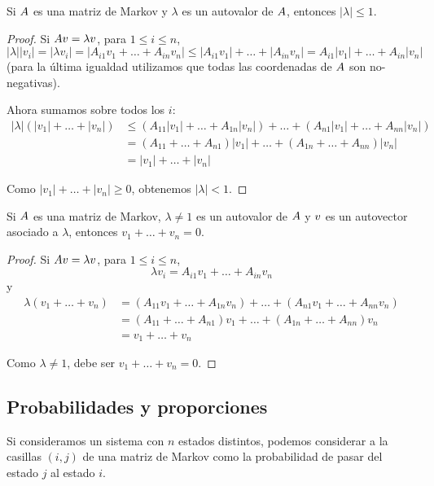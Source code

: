 \begin{prop}
Si $\Ab$ es una matriz de Markov y $\lambda$ es un autovalor de $\Ab$, entonces $|\lambda| \le 1$.
\end{prop}

\begin{proof}
Si $\Ab \vb = \lambda \vb$, para $1 \le i \le n$,
$$
|\lambda| |v_i| = |\lambda v_i| = |A_{i1} v_1 + \dots + A_{in} v_n| \le |A_{i1} v_1| + \dots + |A_{in} v_n| = A_{i1} |v_1| + \dots + A_{in} |v_n|
$$
(para la última igualdad utilizamos que todas las coordenadas de $\Ab$ son no-negativas).

Ahora sumamos sobre todos los $i$:
$$
\begin{aligned}
|\lambda|(|v_1| + \dots + |v_n|) &\le (A_{11} |v_1| + \dots + A_{1n} |v_n|) + \dots + (A_{n1} |v_1| + \dots + A_{nn} |v_n|) \\
&= (A_{11} + \dots + A_{n1}) |v_1| + \dots + (A_{1n} + \dots + A_{nn}) |v_n| \\
&= |v_1| + \dots + |v_n|
\end{aligned}
$$

Como $|v_1| + \dots + |v_n| \ge 0$, obtenemos $|\lambda| < 1$.
\end{proof}

\begin{prop}
Si $\Ab$ es una matriz de Markov, $\lambda \neq 1$ es un autovalor de $\Ab$ y $\vb$ es un autovector asociado a $\lambda$, entonces $v_1 + \dots + v_n = 0$.
\end{prop}

\begin{proof}
Si $\Ab \vb = \lambda \vb$, para $1 \le i \le n$,
$$
\lambda v_i = A_{i1} v_1 + \dots + A_{in} v_n
$$
y
$$
\begin{aligned}
\lambda(v_1 + \dots + v_n) &= (A_{11} v_1 + \dots + A_{1n} v_n) + \dots + (A_{n1} v_1 + \dots + A_{nn} v_n) \\
&= (A_{11} + \dots + A_{n1}) v_1 + \dots + (A_{1n} + \dots + A_{nn}) v_n \\
&= v_1 + \dots + v_n
\end{aligned}
$$

Como $\lambda \ne 1$, debe ser $v_1 + \dots + v_n = 0$.
\end{proof}

\subsection{Probabilidades y proporciones}

Si consideramos un sistema con $n$ estados distintos, podemos considerar a la casillas $(i, j)$ de una matriz de Markov como la probabilidad de pasar del estado $j$ al estado $i$.


